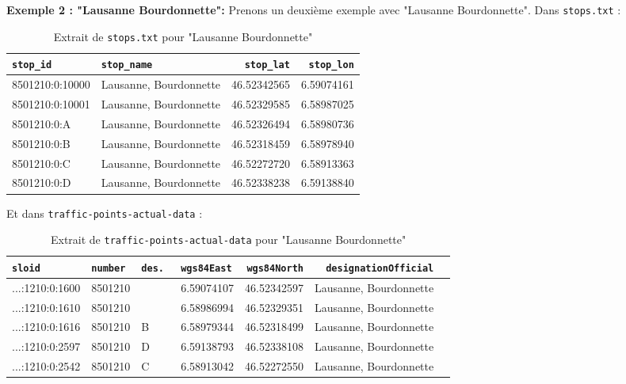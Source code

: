 \textbf{Exemple 2 : "Lausanne Bourdonnette":}
\newline
Prenons un deuxième exemple avec "Lausanne Bourdonnette". Dans \texttt{stops.txt} :
\begin{table}[h]
\caption{Extrait de \texttt{stops.txt} pour "Lausanne Bourdonnette"}
\label{tab:stops_bourdonnette_2}
\centering
\begin{tabular}{l l r r}
\toprule
\texttt{stop\_id} & \texttt{stop\_name} & \texttt{stop\_lat} & \texttt{stop\_lon} \\
\midrule
8501210:0:10000 & Lausanne, Bourdonnette & 46.52342565 & 6.59074161 \\
8501210:0:10001 & Lausanne, Bourdonnette & 46.52329585 & 6.58987025 \\
8501210:0:A & Lausanne, Bourdonnette & 46.52326494 & 6.58980736 \\
8501210:0:B & Lausanne, Bourdonnette & 46.52318459 & 6.58978940 \\
8501210:0:C & Lausanne, Bourdonnette & 46.52272720 & 6.58913363 \\
8501210:0:D & Lausanne, Bourdonnette & 46.52338238 & 6.59138840 \\
\bottomrule
\end{tabular}
\end{table}

Et dans \texttt{traffic-points-actual-data} :

\begin{table}[h]
\caption{Extrait de \texttt{traffic-points-actual-data} pour "Lausanne Bourdonnette"}
\label{tab:traffic_bourdonnette_2}
\centering
\begin{tabular}{l l l l r r l}
\toprule
\texttt{sloid} & \texttt{number} & \texttt{des.
}  & \texttt{wgs84East} & \texttt{wgs84North} & \texttt{designationOfficial} \\
\midrule
...:1210:0:1600 & 8501210 &  & 6.59074107 & 46.52342597 & Lausanne, Bourdonnette \\
...:1210:0:1610 & 8501210 &  & 6.58986994 & 46.52329351 & Lausanne, Bourdonnette \\
...:1210:0:1616 & 8501210 & B & 6.58979344 & 46.52318499 & Lausanne, Bourdonnette \\
...:1210:0:2597 & 8501210 & D & 6.59138793 & 46.52338108 & Lausanne, Bourdonnette \\
...:1210:0:2542 & 8501210 & C & 6.58913042 & 46.52272550 & Lausanne, Bourdonnette \\
\bottomrule
\end{tabular}
\end{table}

